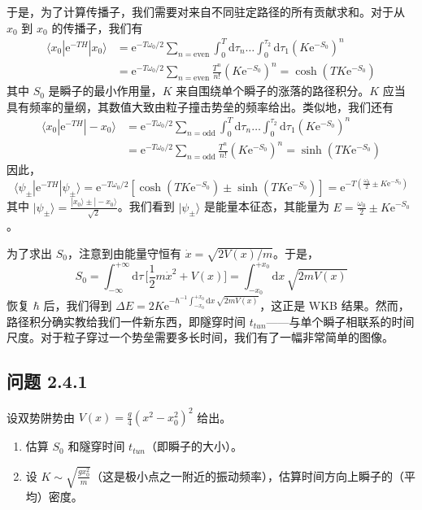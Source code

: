 于是，为了计算传播子，我们需要对来自不同驻定路径的所有贡献求和。对于从 $x_0$ 到 $x_0$ 的传播子，我们有
\begin{align*}
\langle x_0|\mathrm{e}^{-TH}|x_0\rangle &= \mathrm{e}^{-T\omega_0/2} \sum_{n=\mathrm{even}} \int_0^T \mathrm{d}\tau_n \dots \int_0^{\tau_2} \mathrm{d}\tau_1 \left(K\mathrm{e}^{-S_0}\right)^n \\
&= \mathrm{e}^{-T\omega_0/2} \sum_{n=\mathrm{even}} \frac{T^n}{n!} \left(K\mathrm{e}^{-S_0}\right)^n = \cosh(TK\mathrm{e}^{-S_0})
\end{align*}
其中 $S_0$ 是瞬子的最小作用量，$K$ 来自围绕单个瞬子的涨落的路径积分。$K$ 应当具有频率的量纲，其数值大致由粒子撞击势垒的频率给出。类似地，我们还有
\begin{align*}
\langle x_0|\mathrm{e}^{-TH}|-x_0\rangle &= \mathrm{e}^{-T\omega_0/2} \sum_{n=\mathrm{odd}} \int_0^T \mathrm{d}\tau_n \dots \int_0^{\tau_2} \mathrm{d}\tau_1 \left(K\mathrm{e}^{-S_0}\right)^n \\
&= \mathrm{e}^{-T\omega_0/2} \sum_{n=\mathrm{odd}} \frac{T^n}{n!} \left(K\mathrm{e}^{-S_0}\right)^n = \sinh(TK\mathrm{e}^{-S_0})
\end{align*}
因此，
\begin{equation*}
\langle \psi_{\pm}|\mathrm{e}^{-TH}|\psi_{\pm}\rangle = \mathrm{e}^{-T\omega_0/2}\left[\cosh(TK\mathrm{e}^{-S_0}) \pm \sinh(TK\mathrm{e}^{-S_0})\right] = \mathrm{e}^{-T(\frac{\omega_0}{2} \pm K\mathrm{e}^{-S_0})}
\end{equation*}
其中 $|\psi_{\pm}\rangle = \frac{|x_0\rangle \pm |-x_0\rangle}{\sqrt{2}}$。我们看到 $|\psi_{\pm}\rangle$ 是能量本征态，其能量为 $E = \frac{\omega_0}{2} \pm K\mathrm{e}^{-S_0}$。

为了求出 $S_0$，注意到由能量守恒有 $\dot{x} = \sqrt{2V(x)/m}$。于是，
\begin{equation*}
S_0 = \int_{-\infty}^{+\infty} \mathrm{d}\tau\, \Big[\frac{1}{2}m\dot{x}^2 + V(x)\Big] = \int_{-x_0}^{+x_0} \mathrm{d}x\, \sqrt{2mV(x)}
\end{equation*}
恢复 $\hbar$ 后，我们得到 $\Delta E = 2K\mathrm{e}^{-\hbar^{-1}\int_{-x_0}^{+x_0} \mathrm{d}x\, \sqrt{2mV(x)}}$，这正是 WKB 结果。然而，路径积分确实教给我们一件新东西，即隧穿时间 $t_{tun}$——与单个瞬子相联系的时间尺度。对于粒子穿过一个势垒需要多长时间，我们有了一幅非常简单的图像。

\subsection*{问题 2.4.1}
设双势阱势由 $V(x) = \frac{g}{4}(x^2 - x_0^2)^2$ 给出。
\begin{enumerate}
\item 估算 $S_0$ 和隧穿时间 $t_{tun}$（即瞬子的大小）。
\item 设 $K \sim \sqrt{\frac{g x_0^2}{m}}$（这是极小点之一附近的振动频率），估算时间方向上瞬子的（平均）密度。
\end{enumerate}

